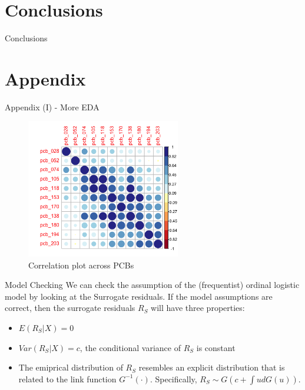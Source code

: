 \documentclass{beamer}\usepackage[]{graphicx}\usepackage[]{color}
\begin{document}
\section{Conclusions}
\begin{frame}{Conclusions}
\end{frame}

\appendix
\section{Appendix}
\begin{frame}{Appendix (I) - More EDA}
\begin{figure}
  \centering
  \includegraphics[width=0.6\textwidth]{corrplot_PCB.png}
\caption{Correlation plot across PCBs}
\label{fig:corrPCB}
\end{figure}
\end{frame}
\begin{frame}{Model Checking}
We can check the assumption of the (frequentist) ordinal logistic model by looking at the Surrogate residuals.
If the model assumptions are correct, then the surrogate residuals $R_S$ will have three properties:
\begin{itemize}
 \item $E(R_S|X)=0$
 \item $Var(R_S|X)=c$, the conditional variance of $R_S$ is constant
 \item The emiprical distribution of $R_S$ resembles an explicit distribution that is related to the link function $G^{-1}(\cdot)$. Specifically, $R_S\sim G(c+\int ud G(u))$.
\end{itemize}
\end{frame}
\end{document}
